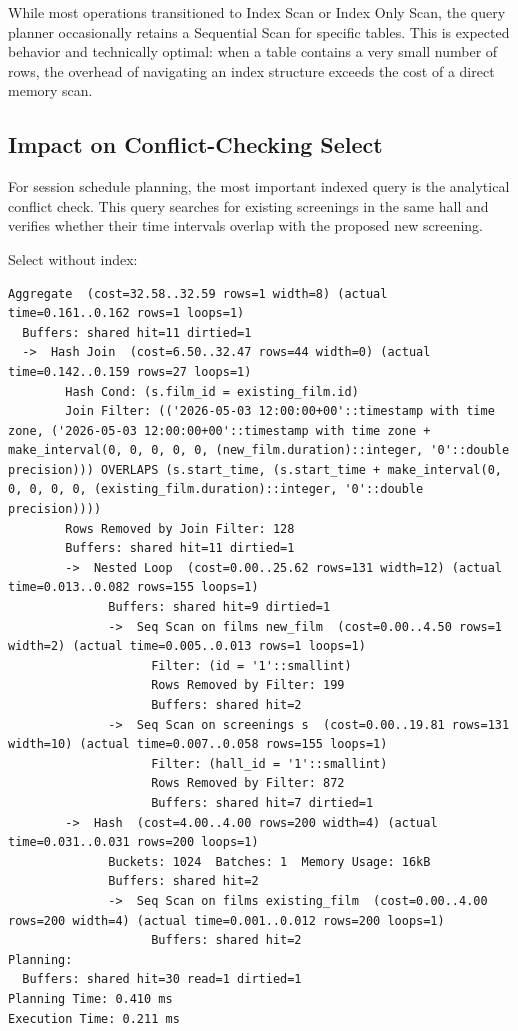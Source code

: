 \documentclass[11pt, a4paper]{article}
\begin{document}
While most operations transitioned to Index Scan or Index Only Scan, the query planner occasionally retains a Sequential Scan for specific tables.
This is expected behavior and technically optimal: when a table contains a very small number of rows, the overhead of navigating an index structure exceeds the cost of a direct memory scan.

\subsection{Impact on Conflict-Checking Select}
For session schedule planning, the most important indexed query is the analytical conflict check.
This query searches for existing screenings in the same hall and verifies whether their time intervals overlap with the proposed new screening.

Select without index:
\begin{lstlisting}
Aggregate  (cost=32.58..32.59 rows=1 width=8) (actual time=0.161..0.162 rows=1 loops=1)
  Buffers: shared hit=11 dirtied=1
  ->  Hash Join  (cost=6.50..32.47 rows=44 width=0) (actual time=0.142..0.159 rows=27 loops=1)
        Hash Cond: (s.film_id = existing_film.id)
        Join Filter: (('2026-05-03 12:00:00+00'::timestamp with time zone, ('2026-05-03 12:00:00+00'::timestamp with time zone + make_interval(0, 0, 0, 0, 0, (new_film.duration)::integer, '0'::double precision))) OVERLAPS (s.start_time, (s.start_time + make_interval(0, 0, 0, 0, 0, (existing_film.duration)::integer, '0'::double precision))))
        Rows Removed by Join Filter: 128
        Buffers: shared hit=11 dirtied=1
        ->  Nested Loop  (cost=0.00..25.62 rows=131 width=12) (actual time=0.013..0.082 rows=155 loops=1)
              Buffers: shared hit=9 dirtied=1
              ->  Seq Scan on films new_film  (cost=0.00..4.50 rows=1 width=2) (actual time=0.005..0.013 rows=1 loops=1)
                    Filter: (id = '1'::smallint)
                    Rows Removed by Filter: 199
                    Buffers: shared hit=2
              ->  Seq Scan on screenings s  (cost=0.00..19.81 rows=131 width=10) (actual time=0.007..0.058 rows=155 loops=1)
                    Filter: (hall_id = '1'::smallint)
                    Rows Removed by Filter: 872
                    Buffers: shared hit=7 dirtied=1
        ->  Hash  (cost=4.00..4.00 rows=200 width=4) (actual time=0.031..0.031 rows=200 loops=1)
              Buckets: 1024  Batches: 1  Memory Usage: 16kB
              Buffers: shared hit=2
              ->  Seq Scan on films existing_film  (cost=0.00..4.00 rows=200 width=4) (actual time=0.001..0.012 rows=200 loops=1)
                    Buffers: shared hit=2
Planning:
  Buffers: shared hit=30 read=1 dirtied=1
Planning Time: 0.410 ms
Execution Time: 0.211 ms
\end{lstlisting}
\end{document}
